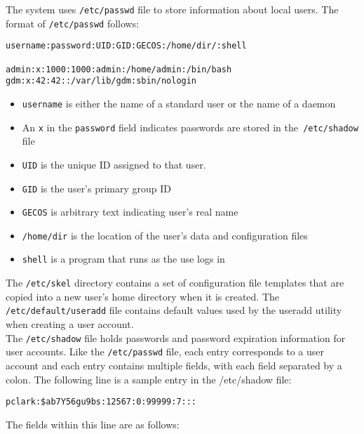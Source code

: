 The system uses \verb|/etc/passwd| file to store information about local users. The format of \verb|/etc/passwd| follows: 

\begin{verbatim}
username:password:UID:GID:GECOS:/home/dir/:shell

admin:x:1000:1000:admin:/home/admin:/bin/bash
gdm:x:42:42::/var/lib/gdm:sbin/nologin
\end{verbatim}

\begin{itemize}
\item \verb|username| is either the name of a standard user or the name of a daemon
\item An \verb|x| in the \verb|password| field indicates passwords are stored in the\verb| /etc/shadow| file
\item \verb|UID| is the unique ID assigned to that user.
\item \verb|GID| is the user's primary group ID
\item \verb|GECOS| is arbitrary text indicating user's real name
\item \verb|/home/dir| is the location of the user's data and configuration files
\item \verb|shell| is a program that runs as the use logs in
\end{itemize}

The \verb|/etc/skel| directory contains a set of configuration file templates that are copied into a new user's home directory when it is created. The \verb|/etc/default/useradd| file contains default values used by the useradd utility when creating a user account.\\

The \verb|/etc/shadow| file holds passwords and password expiration information for user accounts. Like the \verb|/etc/passwd| file, each entry corresponds to a user account and each entry contains multiple fields, with each field separated by a colon. The following line is a sample entry in the /etc/shadow file:

\begin{verbatim}
pclark:$ab7Y56gu9bs:12567:0:99999:7:::
\end{verbatim}

The fields within this line are as follows:

